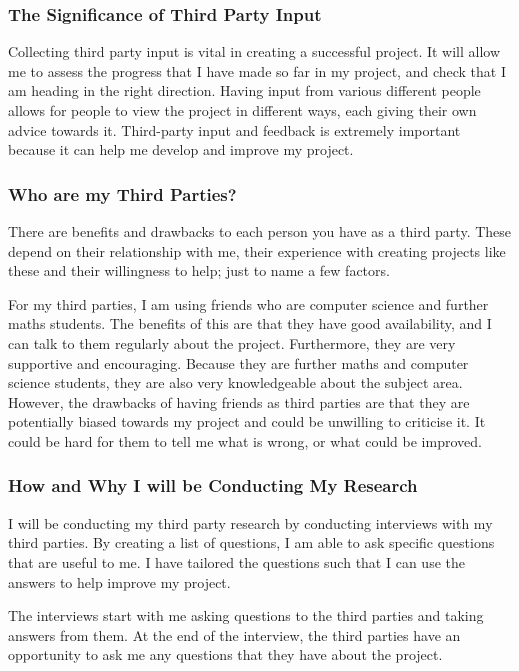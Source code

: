 \documentclass{article}
\begin{document}
\subsubsection{The Significance of Third Party Input}
Collecting third party input is vital in creating a successful project. It will allow me to assess the progress that I have made so far in my project, and check that I am heading in the right direction. Having input from various different people allows for people to view the project in different ways, each giving their own advice towards it. Third-party input and feedback is extremely important because it can help me develop and improve my project.

\subsubsection{Who are my Third Parties?}
There are benefits and drawbacks to each person you have as a third party. These depend on their relationship with me, their experience with creating projects like these and their willingness to help; just to name a few factors.

For my third parties, I am using friends who are computer science and further maths students. The benefits of this are that they have good availability, and I can talk to them regularly about the project. Furthermore, they are very supportive and encouraging. Because they are further maths and computer science students, they are also very knowledgeable about the subject area. However, the drawbacks of having friends as third parties are that they are potentially biased towards my project and could be unwilling to criticise it. It could be hard for them to tell me what is wrong, or what could be improved.

\subsubsection{How and Why I will be Conducting My Research}
I will be conducting my third party research by conducting interviews with my third parties. By creating a list of questions, I am able to ask specific questions that are useful to me. I have tailored the questions such that I can use the answers to help improve my project.

The interviews start with me asking questions to the third parties and taking answers from them. At the end of the interview, the third parties have an opportunity to ask me any questions that they have about the project.
\end{document}
